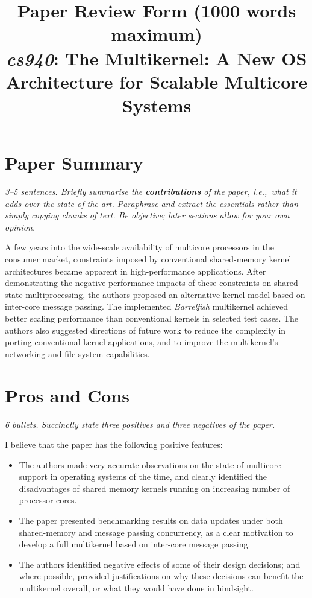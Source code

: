 \documentclass[11pt]{article}
\begin{document}
\title{Paper Review Form (1000 words maximum)\\
  \emph{cs940}: The Multikernel: A New OS Architecture
for Scalable Multicore Systems \cite{baumann2009multikernel}}
\maketitle

\section*{Paper Summary}
\textsl{3--5 sentences. Briefly summarise the {\bf contributions} of the paper, i.e.,~what it adds over the state of the art. Paraphrase and extract the essentials rather than simply copying chunks of text. Be objective; later sections allow for your own opinion.}

A few years into the wide-scale availability of multicore processors in the consumer market, constraints imposed by conventional shared-memory kernel architectures became apparent in high-performance applications. After demonstrating the negative performance impacts of these constraints on shared state multiprocessing, the authors proposed an alternative kernel model based on inter-core message passing. The implemented \emph{Barrelfish} multikernel achieved better scaling performance than conventional kernels in selected test cases. The authors also suggested directions of future work to reduce the complexity in porting conventional kernel applications, and to improve the multikernel's networking and file system capabilities.

\section*{Pros and Cons}
\textsl{6 bullets. Succinctly state three positives and three negatives of the paper.}

I believe that the paper has the following positive features:
\begin{itemize}
	\item The authors made very accurate observations on the state of multicore support in operating systems of the time, and clearly identified the disadvantages of shared memory kernels running on increasing number of processor cores.
	\item The paper presented benchmarking results on data updates under both shared-memory and message passing concurrency, as a clear motivation to develop a full multikernel based on inter-core message passing.
	\item The authors identified negative effects of some of their design decisions; and where possible, provided justifications on why these decisions can benefit the multikernel overall, or what they would have done in hindsight.
\end{itemize}
\end{document}
